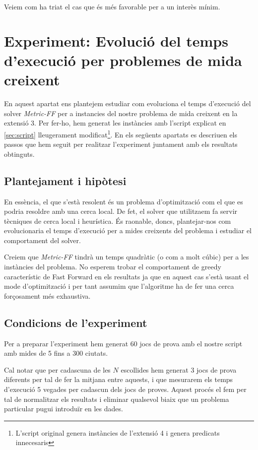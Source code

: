 \documentclass[11pt,a4paper]{article}
\begin{document}
Veiem com ha triat el cas que és més favorable per a un interès mínim.

\clearpage

\section[Experiment extra]{Experiment: Evolució del temps d'execució per problemes de mida creixent}
\label{sec:experiment}

En aquest apartat ens plantejem estudiar com evoluciona el temps d'execució del solver \emph{Metric-FF} per a instancies del nostre problema de mida creixent en la extensió 3. Per fer-ho, hem generat les instàncies amb l'script explicat en \ref{sec:script} lleugerament modificat\footnote{L'script original genera instàncies de l'extensió 4 i genera predicats innecesaris}. En els següents apartats es descriuen els passos que hem seguit per realitzar l'experiment juntament amb els resultats obtinguts.

\subsection{Plantejament i hipòtesi}

En essència, el que s'està resolent és un problema d'optimització com el que es podria resoldre amb una cerca local. De fet, el solver que utilitzaem fa servir tècniques de cerca local i heurística. És raonable, doncs, plantejar-nos com evolucionaria el temps d'execució per a mides creixents del problema i estudiar el comportament del solver. 

Creiem que \emph{Metric-FF} tindrà un temps quadràtic (o com a molt cúbic) per a les instàncies del problema. No esperem trobar el comportament de greedy característic de Fast Forward en els resultats ja que en aquest cas s'està usant el mode d'optimització i per tant assumim que l'algoritme ha de fer una cerca forçosament més exhaustiva.

\subsection{Condicions de l'experiment}

Per a preparar l'experiment hem generat 60 jocs de prova amb el nostre script amb mides de 5 fins a 300 ciutats. 

Cal notar que per cadascuna de les $N$ escollides hem generat 3 jocs de prova diferents per tal de fer la mitjana entre aquests, i que mesurarem els temps d'execució 5 vegades per cadascun dels jocs de proves. Aquest procés el fem per tal de normalitzar els resultats i eliminar qualsevol biaix que un problema particular pugui introduïr en les dades.
\end{document}
